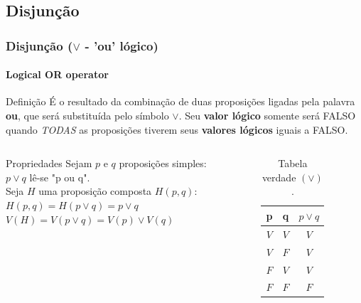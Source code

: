 \documentclass[10pt, headsepline, captions=tableabove,xcolor=table]{beamer}
\begin{document}
\subsection{Disjunção}
%
\begin{frame}[t]
    \frametitle{Disjunção ($\lor$ - 'ou' lógico)}
    \framesubtitle{Logical OR operator}
    \begin{block}{Definição}
        É o resultado da combinação de duas proposições ligadas pela palavra \textbf{ou}, que será substituída pelo símbolo $\lor$. Seu \textbf{valor lógico} somente será FALSO quando \emph{TODAS} as proposições tiverem seus \textbf{valores lógicos} iguais a FALSO.
    \end{block}
    \vspace{-4mm}
    \begin{columns}[t]
        \begin{column}{0.55\textwidth}
            \small
            \begin{alertblock}{Propriedades}
                Sejam $p$ e $q$ proposições simples: \\[2pt]
                $p \lor q$ lê-se "p ou q". \\[2pt]
                Seja $H$ uma proposição composta $H(p,q)$: \\[2pt]
                $H(p,q) = H(p \lor q) = p \lor q$ \\[2pt]
                $V(H) = V(p \lor q) = V(p) \lor V(q)$
            \end{alertblock}
        \end{column}
        \hspace{-10mm}
        \begin{column}{0.4\textwidth}
            \vspace{-3mm}
            \begin{table}[ht]
                \caption{Tabela verdade $(\lor)$.}
                \label{tab:my-table}
                \begin{tabular}{|c|c|c|}
                \hline
                \rowcolor[HTML]{EFEFEF} 
                \textbf{p} & \textbf{q} & \textbf{$p\lor q$} \\ \hline
                $V$        & $V$        & $V$                 \\ \hline
                $V$        & $F$        & $V$                 \\ \hline
                $F$        & $V$        & $V$                 \\ \hline
                $F$        & $F$        & $F$                 \\ \hline
                \end{tabular}
            \end{table}
        \end{column}
    \end{columns}
\end{frame}
\end{document}
